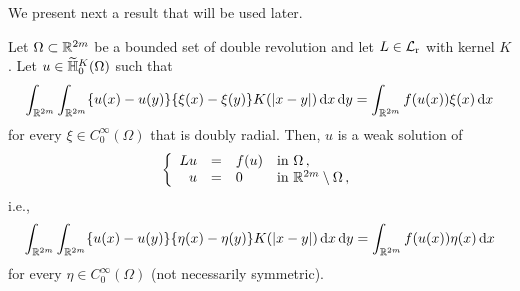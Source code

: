 We present next a result that will be used later. 

\begin{proposition}
	\label{Prop:WeakSolutionForAllTestFunctions}
	Let $\Omega \subset \mathbb{R}^{2m}$ be a bounded set of double revolution and let $L\in \mathcal{L}_{\mathrm{r}}$ with kernel $K$. Let $u\in \widetilde{\mathbb{H}}^K_{0}(\Omega)$ such that
	$$
	\int_{\mathbb{R}^{2m}}\int_{\mathbb{R}^{2m}} \{u(x)-u(y)\}\{\xi(x)-\xi(y)\} K(|x-y|) \,\mathrm{d} x \,\mathrm{d} y = \int_{\mathbb{R}^{2m}} f(u(x)) \xi(x) \,\mathrm{d} x
	$$
	for every $\xi \in C^\infty_0(\Omega)$ that is doubly radial. Then, $u$ is a weak solution of
	$$
	\left\{\begin{array}{rcll}
	Lu &=& f(u) & \text{in } \Omega\,,\\
	u &=& 0 & \text{in } \mathbb{R}^{2m}\setminus \Omega\,,
	\end{array} \right.
	$$
	i.e.,
	$$
	\int_{\mathbb{R}^{2m}}\int_{\mathbb{R}^{2m}} \{u(x)-u(y)\}\{\eta(x)-\eta(y)\} K(|x-y|) \,\mathrm{d} x \,\mathrm{d} y = \int_{\mathbb{R}^{2m}} f(u(x)) \eta(x) \,\mathrm{d} x
	$$
	for every $\eta \in C^\infty_0(\Omega)$ (not necessarily symmetric).
\end{proposition}

